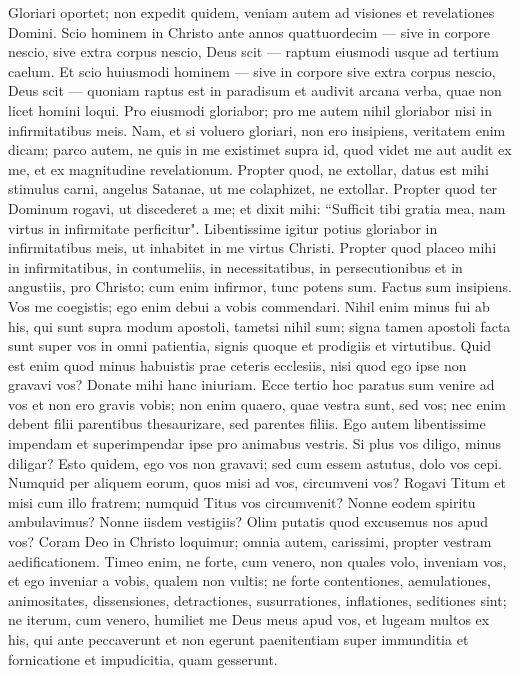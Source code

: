 \begin{biblechapter}  
\verse Gloriari oportet; non expedit quidem, veniam autem ad visiones et revelationes Domini. 
\verse Scio hominem in Christo ante annos quattuordecim — sive in corpore nescio, sive extra corpus nescio, Deus scit — raptum eiusmodi usque ad tertium caelum. 
\verse Et scio huiusmodi hominem — sive in corpore sive extra corpus nescio, Deus scit — 
\verse quoniam raptus est in paradisum et audivit arcana verba, quae non licet homini loqui. 
\verse Pro eiusmodi gloriabor; pro me autem nihil gloriabor nisi in infirmitatibus meis. 
\verse Nam, et si voluero gloriari, non ero insipiens, veritatem enim dicam; parco autem, ne quis in me existimet supra id, quod videt me aut audit ex me, 
\verse et ex magnitudine revelationum. Propter quod, ne extollar, datus est mihi stimulus carni, angelus Satanae, ut me colaphizet, ne extollar. 
\verse Propter quod ter Dominum rogavi, ut discederet a me; 
\verse et dixit mihi: “Sufficit tibi gratia mea, nam virtus in infirmitate perficitur". Libentissime igitur potius gloriabor in infirmitatibus meis, ut inhabitet in me virtus Christi. 
\verse Propter quod placeo mihi in infirmitatibus, in contumeliis, in necessitatibus, in persecutionibus et in angustiis, pro Christo; cum enim infirmor, tunc potens sum. 
\verse Factus sum insipiens. Vos me coegistis; ego enim debui a vobis commendari. Nihil enim minus fui ab his, qui sunt supra modum apostoli, tametsi nihil sum; 
\verse signa tamen apostoli facta sunt super vos in omni patientia, signis quoque et prodigiis et virtutibus. 
\verse Quid est enim quod minus habuistis prae ceteris ecclesiis, nisi quod ego ipse non gravavi vos? Donate mihi hanc iniuriam. 
\verse Ecce tertio hoc paratus sum venire ad vos et non ero gravis vobis; non enim quaero, quae vestra sunt, sed vos; nec enim debent filii parentibus thesaurizare, sed parentes filiis. 
\verse Ego autem libentissime impendam et superimpendar ipse pro animabus vestris. Si plus vos diligo, minus diligar? 
\verse Esto quidem, ego vos non gravavi; sed cum essem astutus, dolo vos cepi.  
\verse Numquid per aliquem eorum, quos misi ad vos, circumveni vos? 
\verse Rogavi Titum et misi cum illo fratrem; numquid Titus vos circumvenit? Nonne eodem spiritu ambulavimus? Nonne iisdem vestigiis? 
\verse Olim putatis quod excusemus nos apud vos? Coram Deo in Christo loquimur; omnia autem, carissimi, propter vestram aedificationem. 
\verse Timeo enim, ne forte, cum venero, non quales volo, inveniam vos, et ego inveniar a vobis, qualem non vultis; ne forte contentiones, aemulationes, animositates, dissensiones, detractiones, susurrationes, inflationes, seditiones sint; 
\verse ne iterum, cum venero, humiliet me Deus meus apud vos, et lugeam multos ex his, qui ante peccaverunt et non egerunt paenitentiam super immunditia et fornicatione et impudicitia, quam gesserunt. 
\end{biblechapter}

